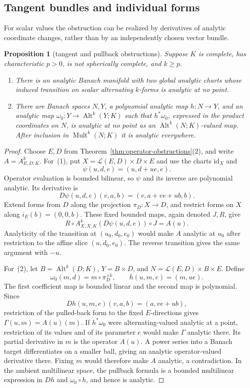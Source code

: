 \documentclass[11pt]{amsart}
\newtheorem{proposition}[theorem]{Proposition}
\theoremstyle{definition}
\theoremstyle{remark}
\numberwithin{equation}{section}
\newcommand{\cL}{\mathcal L}
\newcommand{\Alt}{\operatorname{Alt}}
\newcommand{\Mult}{\operatorname{Mult}}
\newcommand{\id}{\mathrm{id}}
\begin{document}
\subsection{Tangent bundles and individual forms}

For scalar values the obstruction can be realized by derivatives of analytic coordinate changes, rather than by an independently chosen vector bundle.

\begin{proposition}[tangent and pullback obstructions]\label{prop:tangent-obstruction}
Suppose $K$ is complete, has characteristic $p>0$, is not spherically complete, and $k\ge p$.
\begin{enumerate}
\item There is an analytic Banach manifold with two global analytic charts whose induced transition on scalar alternating $k$\nobreakdash-forms is analytic at no point.
\item There are Banach spaces $N,Y$, a polynomial analytic map $h\colon N\to Y$, and an analytic map $\omega_0\colon Y\to\Alt^k(Y;K)$ such that $h^*\omega_0$, expressed in the product coordinates on $N$, is analytic at no point as an $\Alt^k(N;K)$\nobreakdash-valued map. After inclusion in $\Mult^k(N;K)$ it is analytic everywhere.
\end{enumerate}
\end{proposition}

\begin{proof}
Choose $E,D$ from Theorem~\ref{thm:operator-obstructions}(2), and write $A=A^k_{E,D;K}$. For~(1), put $X=\cL(E,D)\times D\times E$ and use the charts $\id_X$ and
\[
 \psi(u,d,e)=(u,d+ue,e).
\]
Operator evaluation is bounded bilinear, so $\psi$ and its inverse are polynomial analytic. Its derivative is
\[
 D\psi(u,d,e)(v,a,b)=(v,a+ve+ub,b).
\]
Extend forms from $D$ along the projection $\pi_D\colon X\to D$, and restrict forms on $X$ along $i_E(b)=(0,0,b)$. These fixed bounded maps, again denoted $J,R$, give
\[
 R\circ A^k_{X,X;K}(D\psi(u,d,e))\circ J=A(u).
\]
Analyticity of the transition at $(u_0,d_0,e_0)$ would make $A$ analytic at $u_0$ after restriction to the affine slice $(u,d_0,e_0)$. The reverse transition gives the same argument with $-u$.

For~(2), let $B=\Alt^k(D;K)$, $Y=B\times D$, and $N=\cL(E,D)\times B\times E$. Define
\[
 \omega_0(m,d)=m\circ\pi_D^{\times k},\qquad
 h(u,m,e)=(m,ue).
\]
The first coefficient map is bounded linear and the second map is polynomial. Since
\[
 Dh(u,m,e)(v,a,b)=(a,ve+ub),
\]
restriction of the pulled-back form to the fixed $E$\nobreakdash-directions gives $\Gamma(u,m)=A(u)(m)$. If $h^*\omega_0$ were alternating-valued analytic at a point, restriction of its values and of its parameter $e$ would make $\Gamma$ analytic there. Its partial derivative in $m$ is the operator $A(u)$. A power series into a Banach target differentiates on a smaller ball, giving an analytic operator-valued derivative there. Fixing $m$ would therefore make $A$ analytic, a contradiction. In the ambient multilinear space, the pullback formula is a bounded multilinear expression in $Dh$ and $\omega_0\circ h$, and hence is analytic.
\end{proof}
\end{document}
